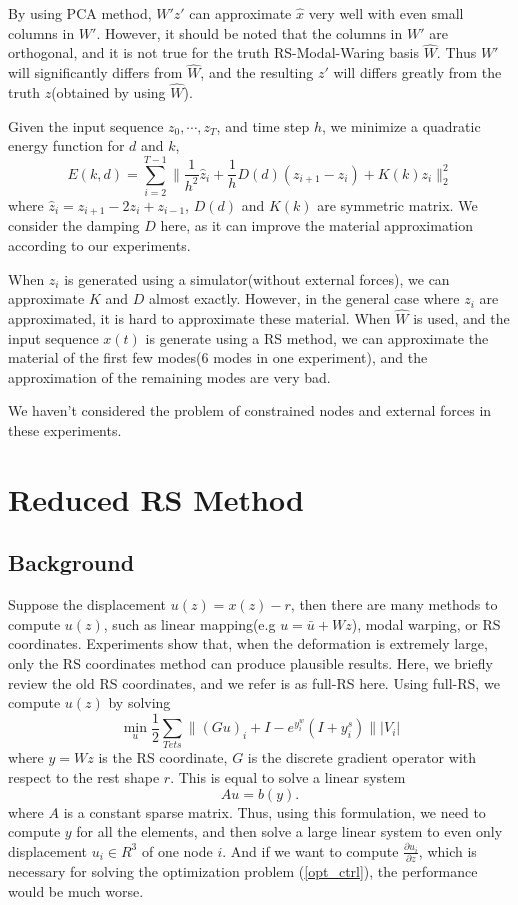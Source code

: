 \documentclass[9pt,twocolumn]{extarticle}
\begin{document}
By using PCA method, $W'z'$ can approximate $\hat{x}$ very well with even small
columns in $W'$. However, it should be noted that the columns in $W'$ are
orthogonal, and it is not true for the truth RS-Modal-Waring basis
$\hat{W}$. Thus $W'$ will significantly differs from $\hat{W}$, and the
resulting $z'$ will differs greatly from the truth $z$(obtained by using
$\hat{W}$).

Given the input sequence $z_0,\cdots,z_T$, and time step $h$, we minimize a
quadratic energy function for $d$ and $k$,
\begin{equation} \label{qua-en}
  E(k,d) = \sum_{i=2}^{T-1} \|\frac{1}{h^2}\hat{z}_i+\frac{1}{h}{D}(d)(z_{i+1}-z_{i})+ K(k)z_i\|_2^2
\end{equation}
where $\hat{z}_i=z_{i+1}-2z_{i}+z_{i-1}$, ${D}(d)$ and $K(k)$ are symmetric
matrix. We consider the damping $D$ here, as it can improve the material
approximation according to our experiments.

When $z_i$ is generated using a simulator(without external forces), we can
approximate $K$ and $D$ almost exactly. However, in the general case where $z_i$
are approximated, it is hard to approximate these material. When $\hat{W}$ is
used, and the input sequence $x(t)$ is generate using a RS method, we can
approximate the material of the first few modes(6 modes in one experiment), and
the approximation of the remaining modes are very bad.

We haven't considered the problem of constrained nodes and external forces in
these experiments.

\section{Reduced RS Method}
\subsection{Background}\label{sec:warping-methods}
Suppose the displacement $u(z)=x(z)-r$, then there are many methods to compute
$u(z)$, such as linear mapping(e.g $u = \bar{u}+Wz$), modal warping, or RS
coordinates. Experiments show that, when the deformation is extremely large,
only the RS coordinates method can produce plausible results. Here, we briefly
review the old RS coordinates, and we refer is as full-RS here. Using full-RS,
we compute $u(z)$ by solving
\begin{equation}
  \min_{u} \frac{1}{2}\sum_{Tets}\|(Gu)_i + I - e^{y_i^w}(I+y_i^s)\||V_i|
\end{equation}
where $y = Wz$ is the RS coordinate, $G$ is the discrete gradient operator with
respect to the rest shape $r$. This is equal to solve a linear system
\begin{equation} \label{rs}
  Au = b(y).
\end{equation}
where $A$ is a constant sparse matrix. Thus, using this formulation, we need to
compute $y$ for all the elements, and then solve a large linear system to even
only displacement $u_i\in R^{3}$ of one node $i$. And if we want to compute
$\frac{\partial{u_i}}{\partial{z}}$, which is necessary for solving the
optimization problem (\ref{opt_ctrl}), the performance would be much worse.
\end{document}
